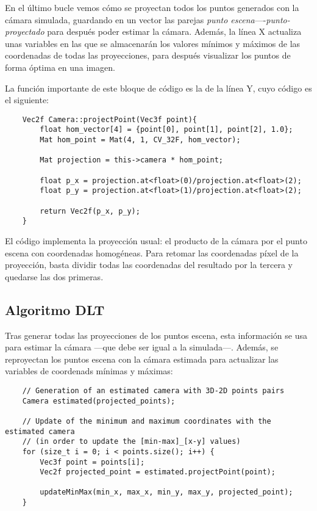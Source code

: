 \documentclass[a4paper, 11pt]{article}
\theoremstyle{definition}
\theoremstyle{theorem}
\begin{document}
    En el último bucle vemos cómo se proyectan todos los puntos generados con la cámara simulada, guardando en un vector las parejas \emph{punto escena}----\emph{punto-proyectado} para después poder estimar la cámara. Además, la línea X actualiza unas variables en las que se almacenarán los valores mínimos y máximos de las coordenadas de todas las proyecciones, para después visualizar los puntos de forma óptima en una imagen.

    La función importante de este bloque de código es la de la línea Y, cuyo código es el siguiente:
    \begin{lstlisting}
    Vec2f Camera::projectPoint(Vec3f point){
        float hom_vector[4] = {point[0], point[1], point[2], 1.0};
        Mat hom_point = Mat(4, 1, CV_32F, hom_vector);

        Mat projection = this->camera * hom_point;

        float p_x = projection.at<float>(0)/projection.at<float>(2);
        float p_y = projection.at<float>(1)/projection.at<float>(2);

        return Vec2f(p_x, p_y);
    }
    \end{lstlisting}

    El código implementa la proyección usual: el producto de la cámara por el punto escena con coordenadas homogéneas. Para retomar las coordenadas píxel de la proyección, basta dividir todas las coordenadas del resultado por la tercera y quedarse las dos primeras.

    \subsection{Algoritmo DLT}
    Tras generar todas las proyecciones de los puntos escena, esta información se usa para estimar la cámara ---que debe ser igual a la simulada---. Además, se reproyectan los puntos escena con la cámara estimada para actualizar las variables de coordenads mínimas y máximas:

    \begin{lstlisting}
    // Generation of an estimated camera with 3D-2D points pairs
    Camera estimated(projected_points);

    // Update of the minimum and maximum coordinates with the estimated camera
    // (in order to update the [min-max]_[x-y] values)
    for (size_t i = 0; i < points.size(); i++) {
        Vec3f point = points[i];
        Vec2f projected_point = estimated.projectPoint(point);

        updateMinMax(min_x, max_x, min_y, max_y, projected_point);
    }
    \end{lstlisting}
\end{document}
